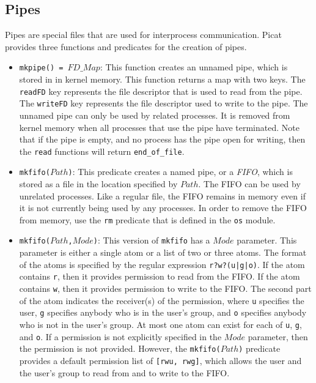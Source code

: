 {\subsection{Pipes}
Pipes are special files that are used for interprocess communication.  Picat provides three functions and predicates for the creation of pipes.
\begin{itemize}
\item \texttt{mkpipe() = $FD\_Map$}:  This function creates an unnamed pipe, which is stored in in kernel memory.  This function returns a map with two keys.  The \texttt{readFD} key represents the file descriptor that is used to read from the pipe.  The \texttt{writeFD} key represents the file descriptor used to write to the pipe.  The unnamed pipe can only be used by related processes.  It is removed from kernel memory when all processes that use the pipe have terminated.  Note that if the pipe is empty, and no process has the pipe open for writing, then the \texttt{read} functions will return \texttt{end\_of\_file}.
\item \texttt{mkfifo($Path$)}:  This predicate creates a named pipe, or a \emph{FIFO}, which is stored as a file in the location specified by $Path$.  The FIFO can be used by unrelated processes.  Like a regular file, the FIFO remains in memory even if it is not currently being used by any processes.  In order to remove the FIFO from memory, use the \texttt{rm} predicate that is defined in the \texttt{os} module.
\item \texttt{mkfifo($Path$,$Mode$)}:  This version of \texttt{mkfifo} has a $Mode$ parameter.  This parameter is either a single atom or a list of two or three atoms.  The format of the atoms is specified by the regular expression \texttt{r?w?(u|g|o)}.  If the atom contains \texttt{r}, then it provides permission to read from the FIFO.  If the atom contains \texttt{w}, then it provides permission to write to the FIFO.  The second part of the atom indicates the receiver(s) of the permission, where \texttt{u} specifies the user, \texttt{g} specifies anybody who is in the user's group, and \texttt{o} specifies anybody who is not in the user's group.  At most one atom can exist for each of \texttt{u}, \texttt{g}, and \texttt{o}.  If a permission is not explicitly specified in the $Mode$ parameter, then the permission is not provided.  However, the \texttt{mkfifo($Path$)} predicate provides a default permission list of \texttt{[rwu, rwg]}, which allows the user and the user's group to read from and to write to the FIFO.
\end{itemize}

}
